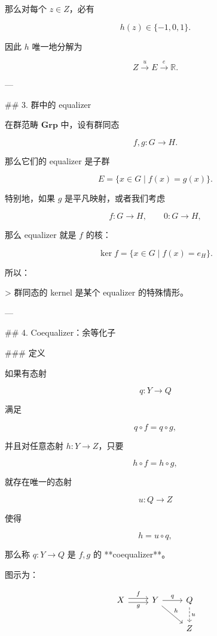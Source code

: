 \documentclass{ctexart}
\begin{document}
\begin{markdown}
那么对每个 $z\in Z$，必有

$$
h(z)\in\{-1,0,1\}.
$$

因此 $h$ 唯一地分解为

$$
Z\xrightarrow{u}E\xrightarrow{e}\mathbb{R}.
$$

---

## 3. 群中的 equalizer

在群范畴 $\mathbf{Grp}$ 中，设有群同态

$$
f,g:G\to H.
$$

那么它们的 equalizer 是子群

$$
E=\{x\in G\mid f(x)=g(x)\}.
$$

特别地，如果 $g$ 是平凡映射，或者我们考虑

$$
f:G\to H,\qquad 0:G\to H,
$$

那么 equalizer 就是 $f$ 的核：

$$
\ker f=\{x\in G\mid f(x)=e_H\}.
$$

所以：

> 群同态的 kernel 是某个 equalizer 的特殊情形。

---

## 4. Coequalizer：余等化子

### 定义

如果有态射

$$
q:Y\to Q
$$

满足

$$
q\circ f=q\circ g,
$$

并且对任意态射 $h:Y\to Z$，只要

$$
h\circ f=h\circ g,
$$

就存在唯一的态射

$$
u:Q\to Z
$$

使得

$$
h=u\circ q,
$$

那么称 $q:Y\to Q$ 是 $f,g$ 的 **coequalizer**。

图示为：
\end{markdown}
\[
\begin{tikzcd}
X \arrow[r,shift left,"f"] \arrow[r,shift right,"g"'] & Y \arrow[r,"q"] \arrow[dr,"h"] & Q \arrow[d,"u",dashed]\\
& & Z
\end{tikzcd}
\]
\end{document}
